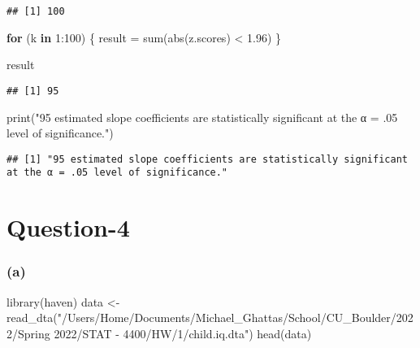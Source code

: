 \documentclass[
]{article}
\newenvironment{Shaded}{\begin{snugshade}}{\end{snugshade}}
\newcommand{\ControlFlowTok}[1]{\textcolor[rgb]{0.13,0.29,0.53}{\textbf{#1}}}
\newcommand{\DecValTok}[1]{\textcolor[rgb]{0.00,0.00,0.81}{#1}}
\newcommand{\FloatTok}[1]{\textcolor[rgb]{0.00,0.00,0.81}{#1}}
\newcommand{\FunctionTok}[1]{\textcolor[rgb]{0.00,0.00,0.00}{#1}}
\newcommand{\NormalTok}[1]{#1}
\newcommand{\OtherTok}[1]{\textcolor[rgb]{0.56,0.35,0.01}{#1}}
\newcommand{\SpecialCharTok}[1]{\textcolor[rgb]{0.00,0.00,0.00}{#1}}
\newcommand{\StringTok}[1]{\textcolor[rgb]{0.31,0.60,0.02}{#1}}
\begin{document}
\begin{verbatim}
## [1] 100
\end{verbatim}

\begin{Shaded}
\begin{Highlighting}[]
\ControlFlowTok{for}\NormalTok{ (k }\ControlFlowTok{in} \DecValTok{1}\SpecialCharTok{:}\DecValTok{100}\NormalTok{) }
\NormalTok{\{}
\NormalTok{  result }\OtherTok{=} \FunctionTok{sum}\NormalTok{(}\FunctionTok{abs}\NormalTok{(z.scores) }\SpecialCharTok{\textless{}} \FloatTok{1.96}\NormalTok{)}
\NormalTok{\}}

\NormalTok{result}
\end{Highlighting}
\end{Shaded}

\begin{verbatim}
## [1] 95
\end{verbatim}

\begin{Shaded}
\begin{Highlighting}[]
\FunctionTok{print}\NormalTok{(}\StringTok{"95 estimated slope coefficients are statistically significant at the α = .05 level of significance."}\NormalTok{)}
\end{Highlighting}
\end{Shaded}

\begin{verbatim}
## [1] "95 estimated slope coefficients are statistically significant at the α = .05 level of significance."
\end{verbatim}

\hypertarget{question-4}{%
\section{Question-4}\label{question-4}}

\hypertarget{a-3}{%
\subsubsection{(a)}\label{a-3}}

\begin{Shaded}
\begin{Highlighting}[]
\FunctionTok{library}\NormalTok{(haven)}
\NormalTok{data }\OtherTok{\textless{}{-}} \FunctionTok{read\_dta}\NormalTok{(}\StringTok{"/Users/Home/Documents/Michael\_Ghattas/School/CU\_Boulder/2022/Spring 2022/STAT {-} 4400/HW/1/child.iq.dta"}\NormalTok{)}
\FunctionTok{head}\NormalTok{(data)}
\end{Highlighting}
\end{Shaded}
\end{document}
